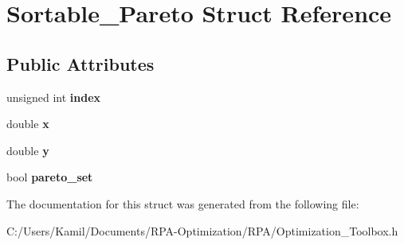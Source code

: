 \hypertarget{struct_sortable___pareto}{}\section{Sortable\+\_\+\+Pareto Struct Reference}
\label{struct_sortable___pareto}
\subsection*{Public Attributes}
\begin{DoxyCompactItemize}
\item 
\mbox{\label{struct_sortable___pareto_ad86fc6339ac5d0a90214bcfe29f2d878}} 
unsigned int {\bfseries index}
\item 
\mbox{\label{struct_sortable___pareto_ae5c3b332c8a192961de0a085d59432da}} 
double {\bfseries x}
\item 
\mbox{\label{struct_sortable___pareto_a00f29310c191ed10f9a6b58977be1bd7}} 
double {\bfseries y}
\item 
\mbox{\label{struct_sortable___pareto_a0e2e26ce019397c46470e63af05fc5c7}} 
bool {\bfseries pareto\+\_\+set}
\end{DoxyCompactItemize}


The documentation for this struct was generated from the following file\+:\begin{DoxyCompactItemize}
\item 
C\+:/\+Users/\+Kamil/\+Documents/\+R\+P\+A-\/\+Optimization/\+R\+P\+A/Optimization\+\_\+\+Toolbox.\+h\end{DoxyCompactItemize}
